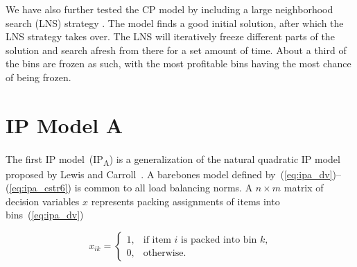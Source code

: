 \documentclass{llncs}
\begin{document}
We have also further tested the CP model by including a large neighborhood search (LNS) strategy \cite{Shaw1998}. The model finds a good initial solution, after which the LNS strategy takes over. The LNS will iteratively freeze different parts of the solution and search afresh from there for a set amount of time. About a third of the bins are frozen as such, with the most profitable bins having the most chance of being frozen.




\section{IP Model A}
\label{sec:ip_model_a}

%

\paragraph{}The first IP model~(IP\textsubscript{A}) is a generalization of the natural quadratic IP model proposed by Lewis and Carroll~\cite{Lewis2016}. A barebones model defined by~(\ref{eq:ipa_dv})--(\ref{eq:ipa_cstr6}) is common to all load balancing norms. A $n \times m$ matrix of decision variables $x$ represents packing assignments of items into bins~(\ref{eq:ipa_dv})

\begin{equation}
  x_{ik}=
  \begin{cases}
    \label{eq:ipa_dv}
    1, & \mbox{if item $i$ is packed into bin $k$,} \\
    0, & \mbox{otherwise.}
  \end{cases}
\end{equation}
\end{document}
